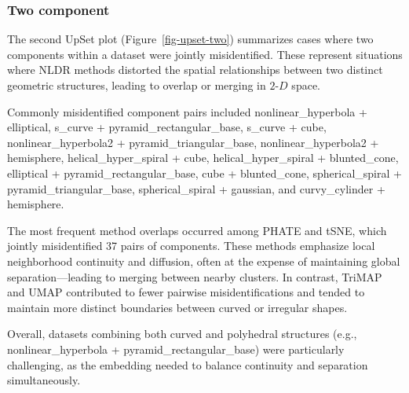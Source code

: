 \documentclass[
  11pt,
  a4paper,
]{report}
\newcommand\gD{$2\text{-}D$}
\begin{document}
\subsubsection{Two component}\label{two-component}

The second UpSet plot (Figure~\ref{fig-upset-two}) summarizes cases
where two components within a dataset were jointly misidentified. These
represent situations where NLDR methods distorted the spatial
relationships between two distinct geometric structures, leading to
overlap or merging in \gD{} space.

Commonly misidentified component pairs included nonlinear\_hyperbola +
elliptical, s\_curve + pyramid\_rectangular\_base, s\_curve + cube,
nonlinear\_hyperbola2 + pyramid\_triangular\_base, nonlinear\_hyperbola2
+ hemisphere, helical\_hyper\_spiral + cube, helical\_hyper\_spiral +
blunted\_cone, elliptical + pyramid\_rectangular\_base, cube +
blunted\_cone, spherical\_spiral + pyramid\_triangular\_base,
spherical\_spiral + gaussian, and curvy\_cylinder + hemisphere.

The most frequent method overlaps occurred among PHATE and tSNE, which
jointly misidentified 37 pairs of components. These methods emphasize
local neighborhood continuity and diffusion, often at the expense of
maintaining global separation---leading to merging between nearby
clusters. In contrast, TriMAP and UMAP contributed to fewer pairwise
misidentifications and tended to maintain more distinct boundaries
between curved or irregular shapes.

Overall, datasets combining both curved and polyhedral structures (e.g.,
nonlinear\_hyperbola + pyramid\_rectangular\_base) were particularly
challenging, as the embedding needed to balance continuity and
separation simultaneously.
\end{document}
